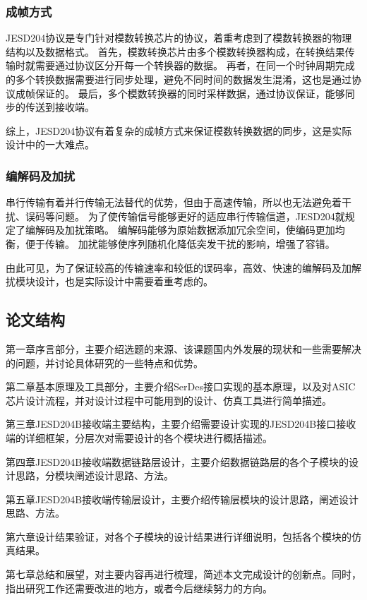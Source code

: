 \documentclass[UTF8]{ctexart}
\begin{document}
\subsubsection{成帧方式}

JESD204协议是专门针对模数转换芯片的协议，着重考虑到了模数转换器的物理结构以及数据格式。
首先，模数转换芯片由多个模数转换器构成，在转换结果传输时就需要通过协议区分开每一个转换器的数据。
再者，在同一个时钟周期完成的多个转换数据需要进行同步处理，避免不同时间的数据发生混淆，这也是通过协议成帧保证的。
最后，多个模数转换器的同时采样数据，通过协议保证，能够同步的传送到接收端。

综上，JESD204协议有着复杂的成帧方式来保证模数转换数据的同步，这是实际设计中的一大难点。

\subsubsection{编解码及加扰}

串行传输有着并行传输无法替代的优势，但由于高速传输，所以也无法避免着干扰、误码等问题。
为了使传输信号能够更好的适应串行传输信道，JESD204就规定了编解码及加扰策略。
编解码能够为原始数据添加冗余空间，使编码更加均衡，便于传输。
加扰能够使序列随机化降低突发干扰的影响，增强了容错。

由此可见，为了保证较高的传输速率和较低的误码率，高效、快速的编解码及加解扰模块设计，也是实际设计中需要着重考虑的。

\subsection{论文结构}

第一章序言部分，主要介绍选题的来源、该课题国内外发展的现状和一些需要解决的问题，并讨论具体研究的一些特点和优势。

第二章基本原理及工具部分，主要介绍SerDes接口实现的基本原理，以及对ASIC芯片设计流程，并对设计过程中可能用到的设计、仿真工具进行简单描述。

第三章JESD204B接收端主要结构，主要介绍需要设计实现的JESD204B接口接收端的详细框架，分层次对需要设计的各个模块进行概括描述。

第四章JESD204B接收端数据链路层设计，主要介绍数据链路层的各个子模块的设计思路，分模块阐述设计思路、方法。

第五章JESD204B接收端传输层设计，主要介绍传输层模块的设计思路，阐述设计思路、方法。

第六章设计结果验证，对各个子模块的设计结果进行详细说明，包括各个模块的仿真结果。

第七章总结和展望，对主要内容再进行梳理，简述本文完成设计的创新点。同时，指出研究工作还需要改进的地方，或者今后继续努力的方向。


\end{document}
